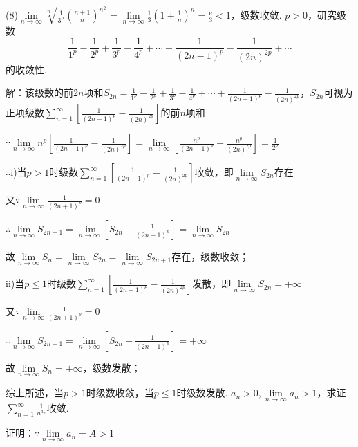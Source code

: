 \documentclass[12pt,UTF8]{ctexart}
\newcommand\Lim[0]{\lim\limits_{n\rightarrow\infty}}
\newcommand\Ser[1]{\sum_{n=#1}^\infty}
\begin{document}
\begin{enumerate}
(8)$\Lim\sqrt[n]{\frac1{3^n}(\frac{n+1}n)^{n^2}}=\Lim\frac13(1+\frac1n)^n=\frac{\mathrm e}3<1$，级数收敛.
$p>0$，研究级数
\[
\frac1{1^p}-\frac1{2^p}+\frac1{3^p}-\frac1{4^p}+\cdots+\frac1{(2n-1)^p}-\frac1{(2n)^{2p}}+\cdots
\]
的收敛性.
%
%
%

解：该级数的前$2n$项和$S_{2n}=\frac1{1^p}-\frac1{2^p}+\frac1{3^p}-\frac1{4^p}+\cdots+\frac1{(2n-1)^p}-\frac1{(2n)^{2p}}$，$S_{2n}$可视为正项级数$\sum_{n=1}^\infty[\frac1{(2n-1)^p}-\frac1{(2n)^{2p}}]$的前$n$项和

$\because\lim\limits_{n\rightarrow\infty}n^p[\frac1{(2n-1)^p}-\frac1{(2n)^{2p}}]=\lim\limits_{n\rightarrow\infty}[\frac{n^p}{(2n-1)^p}-\frac{n^p}{(2n)^{2p}}]=\frac1{2^p}$

$\therefore$i)当$p>1$时级数$\sum_{n=1}^\infty[\frac1{(2n-1)^p}-\frac1{(2n)^{2p}}]$收敛，即$\lim\limits_{n\rightarrow\infty}S_{2n}$存在

又$\because\lim\limits_{n\rightarrow\infty}\frac1{(2n+1)^p}=0$

$\therefore\lim\limits_{n\rightarrow\infty}S_{2n+1}=\lim\limits_{n\rightarrow\infty}[S_{2n}+\frac1{(2n+1)^p}]=\lim\limits_{n\rightarrow\infty}S_{2n}$

故$\lim\limits_{n\rightarrow\infty}S_n=\lim\limits_{n\rightarrow\infty}S_{2n}=\lim\limits_{n\rightarrow\infty}S_{2n+1}$存在，级数收敛；

ii)当$p\leq1$时级数$\sum_{n=1}^\infty[\frac1{(2n-1)^p}-\frac1{(2n)^{2p}}]$发散，即$\lim\limits_{n\rightarrow\infty}S_{2n}=+\infty$

又$\because\lim\limits_{n\rightarrow\infty}\frac1{(2n+1)^p}=0$

$\therefore\lim\limits_{n\rightarrow\infty}S_{2n+1}=\lim\limits_{n\rightarrow\infty}[S_{2n}+\frac1{(2n+1)^p}]=+\infty$

故$\lim\limits_{n\rightarrow\infty}S_n=+\infty$，级数发散；

综上所述，当$p>1$时级数收敛，当$p\leq1$时级数发散.
$a_n>0,\Lim a_n>1$，求证$\Ser{1}\frac1{n^{a_n}}$收敛.

证明：$\because\Lim a_n=A>1$


\end{enumerate}
\end{document}
